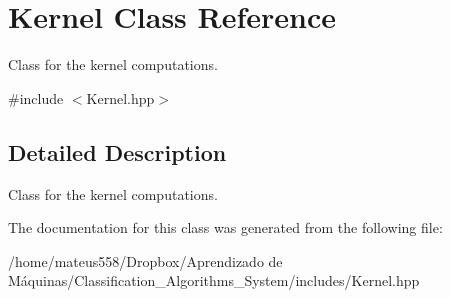 \hypertarget{class_kernel}{}\section{Kernel Class Reference}
\label{class_kernel}


Class for the kernel computations.  




{\ttfamily \#include $<$Kernel.\+hpp$>$}



\subsection{Detailed Description}
Class for the kernel computations. 

The documentation for this class was generated from the following file\+:\begin{DoxyCompactItemize}
\item 
/home/mateus558/\+Dropbox/\+Aprendizado de Máquinas/\+Classification\+\_\+\+Algorithms\+\_\+\+System/includes/Kernel.\+hpp\end{DoxyCompactItemize}
